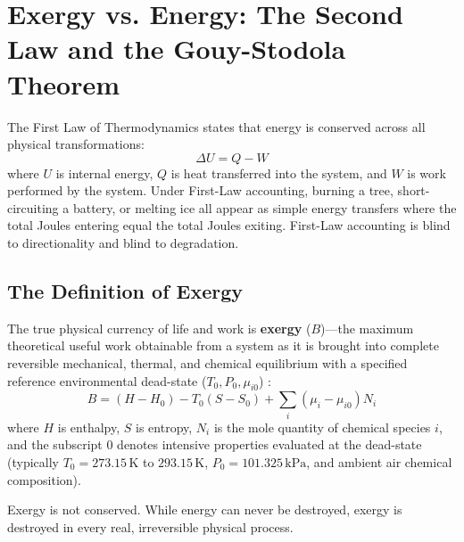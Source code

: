 \section{Exergy vs. Energy: The Second Law and the Gouy-Stodola Theorem}
\label{sec:th_exergy_gouy}

The First Law of Thermodynamics states that energy is conserved across all physical transformations:
\begin{equation}
\Delta U = Q - W
\label{eq:first_law_conservation}
\end{equation}
where $U$ is internal energy, $Q$ is heat transferred into the system, and $W$ is work performed by the system. Under First-Law accounting, burning a tree, short-circuiting a battery, or melting ice all appear as simple energy transfers where the total Joules entering equal the total Joules exiting. First-Law accounting is blind to directionality and blind to degradation.

\subsection{The Definition of Exergy}
The true physical currency of life and work is \textbf{exergy} ($B$)---the maximum theoretical useful work obtainable from a system as it is brought into complete reversible mechanical, thermal, and chemical equilibrium with a specified reference environmental dead-state ($T_0, P_0, \mu_{i0}$) \cite{szargut1988exergy}:
\begin{equation}
B = (H - H_0) - T_0 (S - S_0) + \sum_{i} (\mu_i - \mu_{i0}) N_i
\label{eq:exergy_thermo_definition}
\end{equation}
where $H$ is enthalpy, $S$ is entropy, $N_i$ is the mole quantity of chemical species $i$, and the subscript $0$ denotes intensive properties evaluated at the dead-state (typically $T_0 = 273.15\,\mathrm{K}$ to $293.15\,\mathrm{K}$, $P_0 = 101.325\,\mathrm{kPa}$, and ambient air chemical composition).

Exergy is not conserved. While energy can never be destroyed, exergy is destroyed in every real, irreversible physical process.

